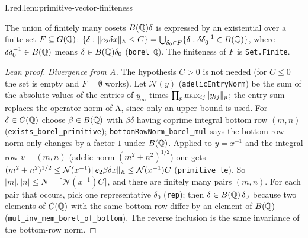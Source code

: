 \begin{lemma}
\end{lemma}
\begin{tfformal}{I.red.lem:primitive-vector-finiteness}
\begin{tffidelity}
The union of finitely many cosets $B(\mathbb{Q})\delta$ is expressed by an existential over a finite set $F\subseteq G(\mathbb{Q})$: $\{\delta:\lVert e_2\delta x\rVert_{\mathbb{A}}\le C\}=\bigcup_{\delta_0\in F}\{\delta:\delta\delta_0^{-1}\in B(\mathbb{Q})\}$, where $\delta\delta_0^{-1}\in B(\mathbb{Q})$ means $\delta\in B(\mathbb{Q})\delta_0$ (\texttt{borel ℚ}). The finiteness of $F$ is \texttt{Set.Finite}.
\end{tffidelity}
\end{tfformal}
\begin{proof}[Lean proof]
\emph{Divergence from A.} The hypothesis $C>0$ is not needed (for $C\le0$ the set is empty and $F=\emptyset$ works). Let $\mathcal N(y)$ (\texttt{adelicEntryNorm}) be the sum of the absolute values of the entries of $y_\infty$ times $\prod_p\max_{ij}\lVert y_{ij}\rVert_p$; the entry sum replaces the operator norm of A, since only an upper bound is used. For $\delta\in G(\mathbb{Q})$ choose $\beta\in B(\mathbb{Q})$ with $\beta\delta$ having coprime integral bottom row $(m,n)$ (\texttt{exists\_borel\_primitive}); \texttt{bottomRowNorm\_borel\_mul} says the bottom-row norm only changes by a factor $1$ under $B(\mathbb{Q})$. Applied to $y=x^{-1}$ and the integral row $v=(m,n)$ (adelic norm $(m^2+n^2)^{1/2}$) one gets $(m^2+n^2)^{1/2}\le\mathcal N(x^{-1})\lVert e_2\beta\delta x\rVert_{\mathbb{A}}\le\mathcal N(x^{-1})C$ (\texttt{primitive\_le}). So $|m|,|n|\le N=\lceil\mathcal N(x^{-1})C\rceil$, and there are finitely many pairs $(m,n)$. For each pair that occurs, pick one representative $\delta_0$ (\texttt{rep}); then $\delta\in B(\mathbb{Q})\,\delta_0$ because two elements of $G(\mathbb{Q})$ with the same bottom row differ by an element of $B(\mathbb{Q})$ (\texttt{mul\_inv\_mem\_borel\_of\_bottom}). The reverse inclusion is the same invariance of the bottom-row norm.
\end{proof}

